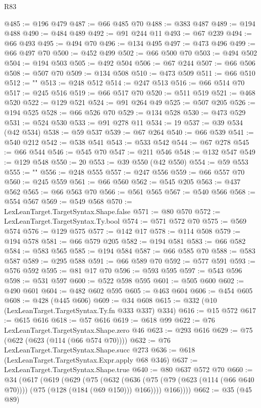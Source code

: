 \begin{lexlean}{R83}
\begin{coremodule}
@485 := @196 @479
@487 := @66 @485 @70
@488 := @383 @487
@489 := @194 @488
@490 := @484 @489
@492 := @91 @244 @11
@493 := @67 @239
@494 := @66 @493
@495 := @494 @70
@496 := @134 @495
@497 := @473 @496
@499 := @66 @497 @70
@500 := @452 @499
@502 := @66 @500 @70
@503 := @494 @502
@504 := @194 @503
@505 := @492 @504
@506 := @67 @244
@507 := @66 @506
@508 := @507 @70
@509 := @134 @508
@510 := @473 @509
@511 := @66 @510
@512 := "{"
@513 := @248 @512
@514 := @247 @513
@516 := @66 @514 @70
@517 := @245 @516
@519 := @66 @517 @70
@520 := @511 @519
@521 := @468 @520
@522 := @129 @521
@524 := @91 @264 @49
@525 := @507 @205
@526 := @194 @525
@528 := @66 @526 @70
@529 := @134 @528
@530 := @473 @529
@531 := @524 @530
@533 := @91 @278 @11
@534 := 19
@537 := @39 @534 (@42 @534)
@538 := @59 @537
@539 := @67 @264
@540 := @66 @539
@541 := @540 @212
@542 := @538 @541
@543 := @533 @542
@544 := @67 @278
@545 := @66 @544
@546 := @545 @70
@547 := @211 @546
@548 := @132 @547
@549 := @129 @548
@550 := 20
@553 := @39 @550 (@42 @550)
@554 := @59 @553
@555 := "}"
@556 := @248 @555
@557 := @247 @556
@559 := @66 @557 @70
@560 := @245 @559
@561 := @66 @560
@562 := @545 @205
@563 := @437 @562
@565 := @66 @563 @70
@566 := @561 @565
@567 := @540 @566
@568 := @554 @567
@569 := @549 @568
@570 := LexLeanTarget.TargetSyntax.Shape.false
@571 := @80 @570
@572 := LexLeanTarget.TargetSyntax.Ty.bool
@574 := @571 @572 @70
@575 := @569 @574
@576 := @129 @575
@577 := @142 @17
@578 := @114 @508
@579 := @194 @578
@581 := @66 @579 @205
@582 := @194 @581
@583 := @66 @582
@584 := @583 @565
@585 := @194 @584
@587 := @66 @585 @70
@588 := @583 @587
@589 := @295 @588
@591 := @66 @589 @70
@592 := @577 @591
@593 := @576 @592
@595 := @81 @17 @70
@596 := @593 @595
@597 := @543 @596
@598 := @531 @597
@600 := @522 @598 @595
@601 := @505 @600
@602 := @490 @601
@604 := @482 @602 @595
@605 := @463 @604
@606 := @454 @605
@608 := @428 (@445 @606)
@609 := @34 @608
@615 := @332 (@10 (LexLeanTarget.TargetSyntax.Ty.fn @333 @337) @334)
@616 := @15 @572
@617 := @615 @616
@618 := @57 @616
@619 := @618 @99
@622 := @76 LexLeanTarget.TargetSyntax.Shape.zero @46
@623 := @293 @616
@629 := @75 (@622 (@623 (@114 (@66 @574 @70))))
@632 := @76 LexLeanTarget.TargetSyntax.Shape.succ @273
@636 := @618 (LexLeanTarget.TargetSyntax.Expr.apply @68 @346)
@637 := LexLeanTarget.TargetSyntax.Shape.true
@640 := @80 @637 @572 @70
@660 := @34
    (@617
      (@619
        (@629
          (@75
            (@632
              (@636 (@75 (@79 (@623 (@114 (@66 @640 @70)))) (@75 (@128 (@184 (@69 @150))) @166))))
            @166))))
@662 := @35 (@45 @89)

\end{coremodule}
\end{lexlean}
